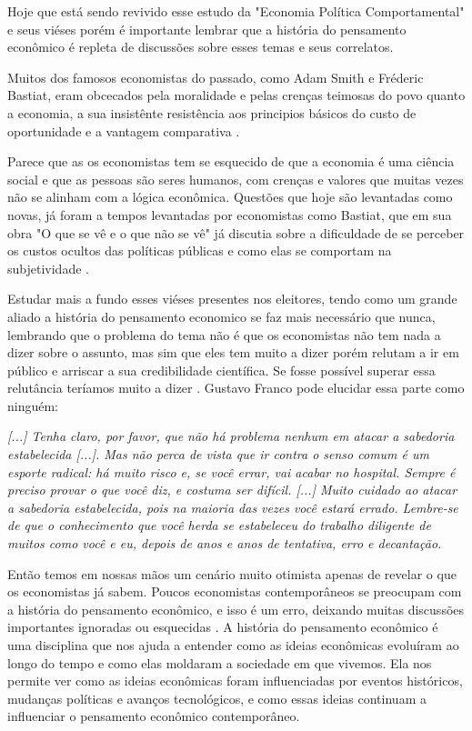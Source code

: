 Hoje que está sendo revivido esse estudo da "Economia Política Comportamental" e seus viéses porém é importante lembrar que a história do pensamento econômico é repleta de discussões sobre esses temas e seus correlatos. 

Muitos dos famosos economistas do passado, como Adam Smith e Fréderic Bastiat, eram obcecados pela moralidade e pelas crenças teimosas do povo quanto a economia, a sua insistênte resistência  aos principios básicos do custo de oportunidade e a vantagem comparativa \cite{hart2019bastiat,Wells2013,The_Myth_of_the_Rational_Voter}.

Parece que as os economistas tem se esquecido de que a economia é uma ciência social e que as pessoas são seres humanos, com crenças e valores que muitas vezes não se alinham com a lógica econômica. Questões que hoje são levantadas como novas, já foram a tempos levantadas por economistas como Bastiat, que em sua obra "O que se vê e o que não se vê" já discutia sobre a dificuldade de se perceber os custos ocultos das políticas públicas e como elas se comportam na subjetividade \cite{hart2019bastiat}.

Estudar mais a fundo esses viéses presentes nos eleitores, tendo como um grande aliado a história do pensamento economico se faz mais necessário que nunca, lembrando que o problema do tema não é que os economistas não tem nada a dizer sobre o assunto, mas sim que eles tem muito a dizer porém relutam a ir em público e arriscar a sua credibilidade científica. Se fosse possível superar essa relutância teríamos muito a dizer \cite{The_Myth_of_the_Rational_Voter}. Gustavo Franco pode elucidar essa parte como ninguém:

\begin{citacao}
    \textit{[...] Tenha claro, por favor, que não há problema nenhum em atacar a sabedoria estabelecida [...]. Mas não perca de vista que ir contra o senso comum é um esporte radical: há muito risco e, se você errar, vai acabar no hospital. Sempre é preciso provar o que você diz, e costuma ser difícil. [...] Muito cuidado ao atacar a sabedoria estabelecida, pois na maioria das vezes você estará errado. Lembre-se de que o conhecimento que você herda se estabeleceu do trabalho diligente de muitos como você e eu, depois de anos e anos de tentativa, erro e decantação. \newline
    }  \cite{franco2022cartas}
\end{citacao}

Então temos em nossas mãos um cenário muito otimista apenas de revelar o que os economistas já sabem. Poucos economistas contemporâneos se preocupam com a história do pensamento econômico, e isso é um erro, deixando muitas discussões importantes ignoradas ou esquecidas \cite{mark_history}. A história do pensamento econômico é uma disciplina que nos ajuda a entender como as ideias econômicas evoluíram ao longo do tempo e como elas moldaram a sociedade em que vivemos. Ela nos permite ver como as ideias econômicas foram influenciadas por eventos históricos, mudanças políticas e avanços tecnológicos, e como essas ideias continuam a influenciar o pensamento econômico contemporâneo.

